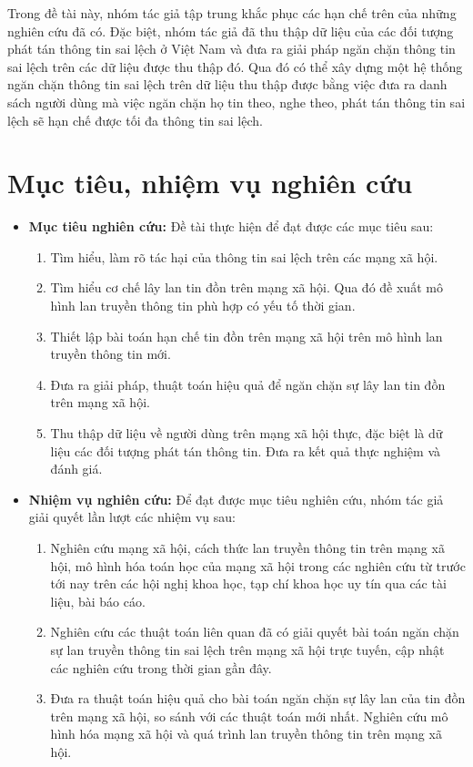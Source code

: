 Trong đề tài này, nhóm tác giả tập trung khắc phục các hạn chế trên của những nghiên cứu đã có. Đặc biệt, nhóm tác giả đã thu thập dữ liệu của các đối tượng phát tán thông tin sai lệch ở Việt Nam và đưa ra giải pháp ngăn chặn thông tin sai lệch trên các dữ liệu được thu thập đó. Qua đó có thể xây dựng một hệ thống ngăn chặn thông tin sai lệch trên dữ liệu thu thập được bằng việc đưa ra danh sách người dùng mà việc ngăn chặn họ tin theo, nghe theo, phát tán thông tin sai lệch sẽ hạn chế được tối đa thông tin sai lệch.

\tocless\section {Mục tiêu, nhiệm vụ nghiên cứu}
\begin {itemize}
	\item {\bfseries Mục tiêu nghiên cứu:} Đề tài thực hiện để đạt được các mục tiêu sau:
		\begin {enumerate} [+]
			\item Tìm hiểu, làm rõ tác hại của thông tin sai lệch trên các mạng xã hội.
			\item Tìm hiểu cơ chế lây lan tin đồn trên mạng xã hội. Qua đó đề xuất mô hình lan truyền thông tin phù hợp có yếu tố thời gian.
			\item Thiết lập bài toán hạn chế tin đồn trên mạng xã hội trên mô hình lan truyền thông tin mới.
			\item Đưa ra giải pháp, thuật toán hiệu quả để ngăn chặn sự lây lan tin đồn trên mạng xã hội.
			\item Thu thập dữ liệu về người dùng trên mạng xã hội thực, đặc biệt là dữ liệu các đối tượng phát tán thông tin. Đưa ra kết quả thực nghiệm và đánh giá. 
		\end {enumerate}
	\item {\bfseries Nhiệm vụ nghiên cứu: }Để đạt được mục tiêu nghiên cứu, nhóm tác giả giải quyết lần lượt các nhiệm vụ sau:
		\begin {enumerate} [+]
			\item Nghiên cứu mạng xã hội, cách thức lan truyền thông tin trên mạng xã hội, mô hình hóa toán học của mạng xã hội trong các nghiên cứu từ trước tới nay trên các hội nghị khoa học, tạp chí khoa học uy tín qua các tài liệu, bài báo cáo.
			\item Nghiên cứu các thuật toán liên quan đã có giải quyết bài toán ngăn chặn sự lan truyền thông tin sai lệch trên mạng xã hội trực tuyến, cập nhật các nghiên cứu trong thời gian gần đây.
			\item Đưa ra thuật toán hiệu quả cho bài toán ngăn chặn sự lây lan của tin đồn trên mạng xã hội, so sánh với các thuật toán mới nhất. Nghiên cứu mô hình hóa mạng xã hội và quá trình lan truyền thông tin trên mạng xã hội.

\end{enumerate}
\end{itemize}
